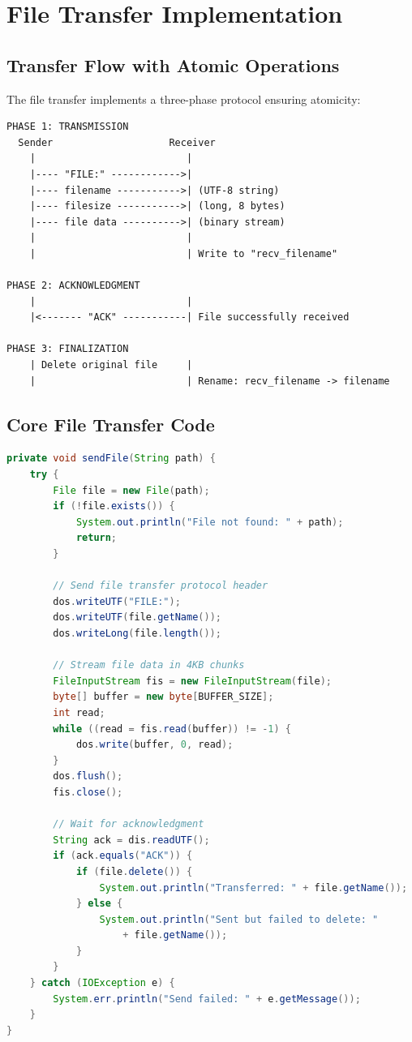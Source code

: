 \documentclass[12pt, letterpaper]{article}
\begin{document}
\section{File Transfer Implementation}

\subsection{Transfer Flow with Atomic Operations}

The file transfer implements a three-phase protocol ensuring atomicity:

\begin{verbatim}
PHASE 1: TRANSMISSION
  Sender                    Receiver
    |                          |
    |---- "FILE:" ------------>|
    |---- filename ----------->| (UTF-8 string)
    |---- filesize ----------->| (long, 8 bytes)
    |---- file data ---------->| (binary stream)
    |                          |
    |                          | Write to "recv_filename"
    
PHASE 2: ACKNOWLEDGMENT
    |                          |
    |<------- "ACK" -----------| File successfully received
    
PHASE 3: FINALIZATION
    | Delete original file     |
    |                          | Rename: recv_filename -> filename
\end{verbatim}

\subsection{Core File Transfer Code}

\begin{lstlisting}[language=Java,caption=Client/Server File Sending,label=code:sendfile]
private void sendFile(String path) {
    try {
        File file = new File(path);
        if (!file.exists()) {
            System.out.println("File not found: " + path);
            return;
        }
        
        // Send file transfer protocol header
        dos.writeUTF("FILE:");
        dos.writeUTF(file.getName());
        dos.writeLong(file.length());
        
        // Stream file data in 4KB chunks
        FileInputStream fis = new FileInputStream(file);
        byte[] buffer = new byte[BUFFER_SIZE];
        int read;
        while ((read = fis.read(buffer)) != -1) {
            dos.write(buffer, 0, read);
        }
        dos.flush();
        fis.close();
        
        // Wait for acknowledgment
        String ack = dis.readUTF();
        if (ack.equals("ACK")) {
            if (file.delete()) {
                System.out.println("Transferred: " + file.getName());
            } else {
                System.out.println("Sent but failed to delete: " 
                    + file.getName());
            }
        }
    } catch (IOException e) {
        System.err.println("Send failed: " + e.getMessage());
    }
}
\end{lstlisting}
\end{document}
